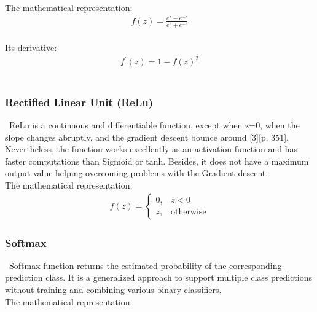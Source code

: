The mathematical representation:\\

\begin{align*}
f(z) = \frac{e^{z} - e^{-z}}{e^{z} + e^{-z}}
\end{align*}\\

Its derivative:\\

\begin{align*}
f^{'}(z) = 1 - f(z)^2
\end{align*}\\

\subsubsection{Rectified Linear Unit (ReLu)}
\label{chap:Rectified Linear Unit}

\qquad \, ReLu is a continuous and differentiable function, except when z=0, when the slope changes abruptly, and the gradient descent bounce around [3][p. 351]. Nevertheless, the function works excellently as an activation function and has faster computations than Sigmoid or tanh. Besides, it does not have a maximum output value helping overcoming problems with the Gradient descent.\\

The mathematical representation:\\

\begin{align*}
f(z) = 
\begin{cases}
0,  &  z < 0\\
z,  & \text{otherwise}
\end{cases}
\end{align*}

\subsubsection{Softmax}
\label{chap:Softmax}

\qquad \, Softmax function returns the estimated probability of the corresponding prediction class. It is a generalized approach to support multiple class predictions without training and combining various binary classifiers.\\

The mathematical representation:\\

\begin{align*}

\end{align*}\\

